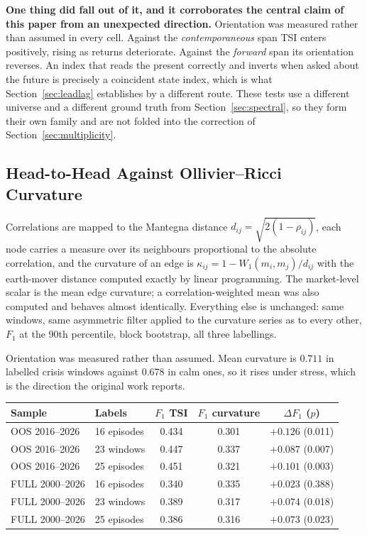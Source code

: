 \documentclass[11pt,a4paper]{article}
\begin{document}
\textbf{One thing did fall out of it, and it corroborates the central claim of
this paper from an unexpected direction.} Orientation was measured rather than
assumed in every cell. Against the \emph{contemporaneous} span TSI enters
positively, rising as returns deteriorate. Against the \emph{forward} span its
orientation reverses. An index that reads the present correctly and inverts when
asked about the future is precisely a coincident state index, which is what
Section~\ref{sec:leadlag} establishes by a different route. These tests use a
different universe and a different ground truth from Section~\ref{sec:spectral},
so they form their own family and are not folded into the correction of
Section~\ref{sec:multiplicity}.

\subsection{Head-to-Head Against Ollivier--Ricci Curvature}
\label{sec:ricci}

Correlations are mapped to the Mantegna distance $d_{ij} = \sqrt{2(1-\rho_{ij})}$,
each node carries a measure over its neighbours proportional to the absolute
correlation, and the curvature of an edge is
$\kappa_{ij} = 1 - W_1(m_i,m_j)/d_{ij}$ with the earth-mover distance computed
exactly by linear programming. The market-level scalar is the mean edge
curvature; a correlation-weighted mean was also computed and behaves almost
identically. Everything else is unchanged: same windows, same asymmetric
filter applied to the curvature series as to every other, $F_1$ at the 90th
percentile, block bootstrap, all three labellings.

Orientation was measured rather than assumed. Mean curvature is $0.711$ in
labelled crisis windows against $0.678$ in calm ones, so it rises under stress,
which is the direction the original work reports.

\begin{center}
\begin{tabular}{llccc}
\hline
Sample & Labels & $F_1$ TSI & $F_1$ curvature & $\Delta F_1$ ($p$) \\
\hline
OOS 2016--2026 & 16 episodes & 0.434 & 0.301 & $+0.126$ (0.011) \\
OOS 2016--2026 & 23 windows  & 0.447 & 0.337 & $+0.087$ (0.007) \\
OOS 2016--2026 & 25 episodes & 0.451 & 0.321 & $+0.101$ (0.003) \\
FULL 2000--2026 & 16 episodes & 0.340 & 0.335 & $+0.023$ (0.388) \\
FULL 2000--2026 & 23 windows  & 0.389 & 0.317 & $+0.074$ (0.018) \\
FULL 2000--2026 & 25 episodes & 0.386 & 0.316 & $+0.073$ (0.023) \\
\hline
\end{tabular}
\end{center}
\end{document}
